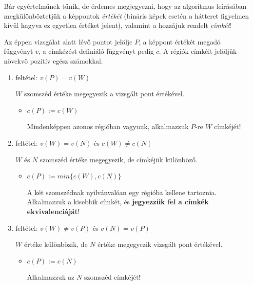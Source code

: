 Bár egyértelműnek tűnik, de érdemes megjegyezni, hogy az algoritmus leírásában megkülönböztetjük a képpontok \emph{értékét} (bináris képek esetén a hátteret figyelmen kívül hagyva ez egyetlen értéket jelent), valamint a hozzájuk rendelt \emph{címkét}!

\bigskip

Az éppen vizsgálat alatt lévő pontot jelölje $P$, a képpont értékét megadó függvényt $v$, a címkézést definiáló függvényt pedig $c$. A régiók címkéit jelöljük növekvő pozitív egész számokkal.

\begin{enumerate}
  \item feltétel: $v(P) = v(W)$ \\ \begin{small} $W$ szomszéd értéke megegyezik a vizsgált pont értékével. \end{small}   
    \begin{itemize}
      \item $c(P) := c(W)$ \\ \begin{small} Mindenképpen azonos régióban vagyunk, alkalmazzuk $P$-re $W$ címkéjét! \end{small}
    \end{itemize}
 
  \item feltétel: $v(W) = v(N)$ és $c(W) \neq c(N)$ \\ \begin{small}$W$ és $N$ szomszéd értéke megegyezik, de címkéjük különböző. \end{small}
    \begin{itemize}
      \item $c(P) := min \lbrace c(W), c(N)\rbrace$ \\ \begin{small}A két szomszédnak nyilvánvalóan egy régióba kellene tartoznia. Alkalmazzuk a kisebbik címkét, és \textbf{jegyezzük fel a címkék ekvivalenciáját}!\end{small}
    \end{itemize}

  \item feltétel: $v(W) \neq v(P)$ és $v(N) = v(P)$ \\ \begin{small}$W$ értéke különbözik, de $N$ értéke megegyezik vizsgált pont értékével. \end{small}
    \begin{itemize}
      \item $c(P) := c(N)$ \\ \begin{small}Alkalmazzuk az $N$ szomszéd címkéjét!\end{small}
    \end{itemize}


\end{enumerate}

